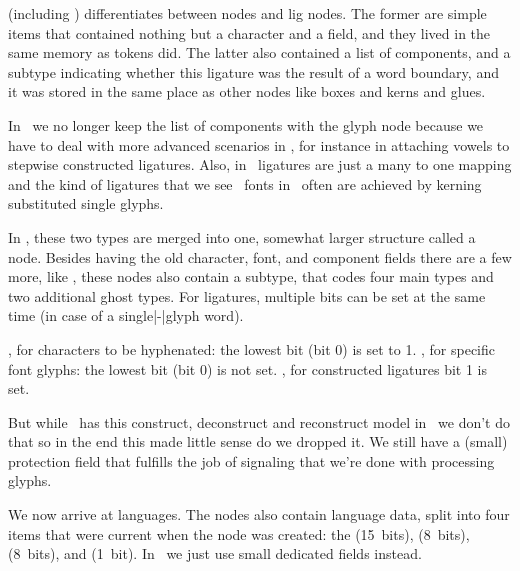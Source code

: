\stopsection

\startsection[title={Characters, glyphs and discretionaries},reference=charsandglyphs]

 (including \PDFTEX) differentiates between  nodes and \type
{lig} nodes. The former are simple items that contained nothing but a \quote
{character} and a  field, and they lived in the same memory as
tokens did. The latter also contained a list of components, and a subtype
indicating whether this ligature was the result of a word boundary, and it was
stored in the same place as other nodes like boxes and kerns and glues.

In \LUAMETATEX\ we no longer keep the list of components with the glyph node
because we have to deal with more advanced scenarios in , for
instance in attaching vowels to stepwise constructed ligatures. Also, in
\OPENTYPE\ ligatures are just a many to one mapping and the kind of ligatures
that we see \TEX\ fonts in \OPENTYPE\ often are achieved by kerning substituted
single glyphs.

In \LUATEX, these two types are merged into one, somewhat larger structure called
a  node. Besides having the old character, font, and component
fields there are a few more, like , these nodes also contain a
subtype, that codes four main types and two additional ghost types. For
ligatures, multiple bits can be set at the same time (in case of a single|-|glyph
word).

\startitemize
    \startitem
        , for characters to be hyphenated: the lowest bit
        (bit 0) is set to 1.
    \stopitem
    \startitem
        , for specific font glyphs: the lowest bit (bit 0) is
        not set.
    \stopitem
    \startitem
        , for constructed ligatures bit 1 is set.
    \stopitem
\stopitemize

But while \ has this construct, deconstruct and reconstruct model in \LUATEX\
we don't do that so in the end this made little sense do we dropped it. We still
have a (small) protection field that fulfills the job of signaling that we're done
with processing glyphs.

We now arrive at languages. The  nodes also contain language data,
split into four items that were current when the node was created: the \type
{\setlanguage} (15~bits), \type {\lefthyphenmin} (8~bits), \type {\righthyphenmin}
(8~bits), and \type {\uchyph} (1~bit). In \LUAMETATEX\ we just use small
dedicated fields instead.

